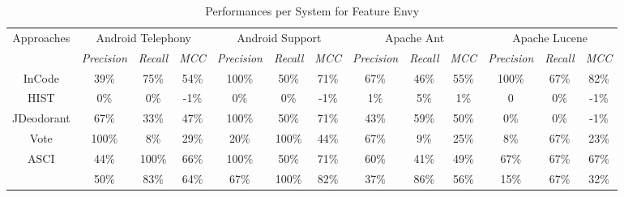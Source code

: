 \begin{table}
\caption{Performances per System for Feature Envy}
\label{Table: performances feature envy}
\begin{adjustbox}{width=\textwidth}
\begin{tabular}{|c|c|c|c|c|c|c|c|c|c|c|c|c|}
\hline
\multirow{2}{*}{Approaches}& 
\multicolumn{3}{c|}{
	Android Telephony
} 
&\multicolumn{3}{c|}{
	Android Support
}
&\multicolumn{3}{c|}{
	Apache Ant
}
&\multicolumn{3}{c|}{
	Apache Lucene 
}\bigstrut [t] \\ 
\cline{2-13}
&\textit{Precision}&\textit{Recall}&\textit{  MCC  }
&\textit{Precision}&\textit{Recall}&\textit{  MCC  }
&\textit{Precision}&\textit{Recall}&\textit{  MCC  }
&\textit{Precision}&\textit{Recall}&\textit{  MCC  } \bigstrut [t]\\
\hline
InCode &39\%&75\%&54\%&100\%&50\%&71\%&67\%&46\%&55\%&100\%&67\%&82\% \bigstrut \\ \hline
HIST &0\%&0\%&-1\%&0\%&0\%&-1\%&1\%&5\%&1\%&0&0\%&-1\% \bigstrut \\ \hline
JDeodorant &67\%&33\%&47\%&100\%&50\%&71\%&43\%&59\%&50\%&0\%&0\%&-1\% \bigstrut \\ \hline
Vote &100\%&8\%&29\%&20\%&100\%&44\%&67\%&9\%&25\%&8\%&67\%&23\% \bigstrut \\ \hline
ASCI &44\%&100\%&66\%&100\%&50\%&71\%&60\%&41\%&49\%&67\%&67\%&67\% \bigstrut \\ \hline
\textbf{\NAME{}} &50\%&83\%&64\%&67\%&100\%&82\%&37\%&86\%&56\%&15\%&67\%&32\% \bigstrut \\ \hline
\end{tabular}
\end{adjustbox}

\bigskip


\end{table}
